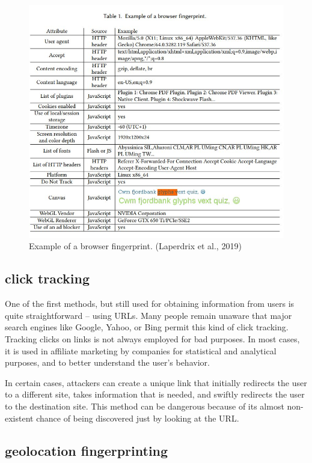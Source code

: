 \documentclass[10pt,a4paper,column]{article}
\begin{document}
\begin{figure}
    \centering
    \includegraphics[scale = 0.4]{Browser-Fingerprint-example.jpg}
    \caption{Example of a browser fingerprint. \cite{table}(Laperdrix et al., 2019)}
    \label{fig:1}
\end{figure}


\subsection{click tracking} 
One of the first methods, but still used for obtaining information from users is quite straightforward – using URLs\cite{webtrackingMID}. Many people remain unaware that major search engines like Google, Yahoo, or Bing permit this kind of click tracking\cite{hostFingerprint}. Tracking clicks on links is not always employed for bad purposes. In most cases, it is used in affiliate marketing by companies for statistical and analytical purposes, and to better understand the user's behavior.

In certain cases, attackers can create a unique link that initially redirects the user to a different site, takes information that is needed, and swiftly redirects the user to the destination site. This method can be dangerous because of its almost non-existent chance of being discovered just by looking at the URL. 

\subsection{geolocation fingerprinting}
\end{document}
